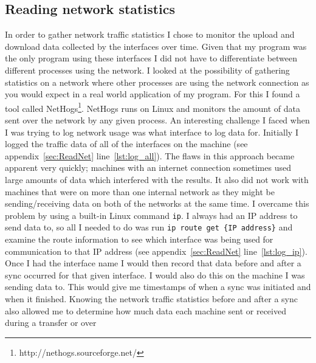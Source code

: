 \documentclass[12pt]{article}
\begin{document}
\subsection{Reading network statistics}
\label{sec:iface_mon}
In order to gather network traffic statistics
I chose to monitor the upload and download
data collected by the interfaces over time.
Given that my program was the only program
using these interfaces I did not have to
differentiate between different processes
using the network.
I looked at the possibility of gathering
statistics on a network where other processes
are using the network connection as you
would expect in a real world application
of my program. For this I found a tool called
NetHogs\footnote{http://nethogs.sourceforge.net/}.
NetHogs runs on Linux and monitors the
amount of data sent over the network by any
given process.
An interesting challenge I faced when I was trying
to log network usage was what interface to log
data for. Initially I logged the traffic data of all of the
interfaces on the machine (see appendix~\ref{sec:ReadNet}
line~\ref{lst:log_all}). The flaws in this approach
became apparent very quickly; machines with an
internet connection sometimes used large amounts
of data which interfered with the results. It also did not work
with machines that were on more than one internal
network as they might be sending/receiving data
on both of the networks at the same time. I overcame
this problem by using a built-in Linux command \texttt{ip}.
I always had an IP address to send data to, so all
I needed to do was run \texttt{ip route get \{IP address\}}
and examine the route information to see which interface
was being used for communication to that IP 
address (see appendix~\ref{sec:ReadNet} line~\ref{lst:log_ip}).
Once I had the interface name I would then record that
data before and after a sync occurred for that given
interface. I would also do this on the machine I
was sending data to. This would give me timestamps
of when a sync was initiated and when it finished.
Knowing the network traffic statistics before and after
a sync also allowed me to determine how much data each
machine sent or received during a transfer or over
\end{document}
